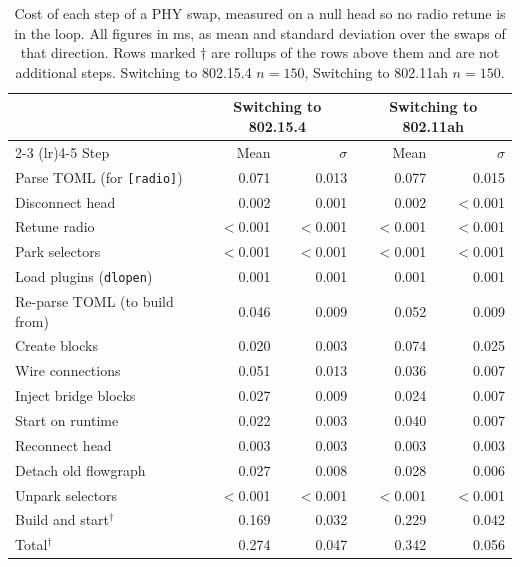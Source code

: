 \begin{table}[t]
  \centering
  \small
  \caption{Cost of each step of a PHY swap, measured on a null head so no radio retune is in the loop. All figures in ms, as mean and standard deviation over the swaps of that direction. Rows marked $\dagger$ are rollups of the rows above them and are not additional steps. Switching to 802.15.4 $n=150$, Switching to 802.11ah $n=150$.}
  \label{tab:softswap-latency}
  \begin{tabular}{lrrrr}
    \toprule
    & \multicolumn{2}{c}{Switching to 802.15.4} & \multicolumn{2}{c}{Switching to 802.11ah} \\
    \cmidrule(lr){2-3} \cmidrule(lr){4-5}
    Step & {Mean} & {$\sigma$} & {Mean} & {$\sigma$} \\
    \midrule
    Parse TOML (for \texttt{[radio]}) & 0.071 & 0.013 & 0.077 & 0.015 \\
    Disconnect head & 0.002 & 0.001 & 0.002 & $<$0.001 \\
    Retune radio & $<$0.001 & $<$0.001 & $<$0.001 & $<$0.001 \\
    Park selectors & $<$0.001 & $<$0.001 & $<$0.001 & $<$0.001 \\
    Load plugins (\texttt{dlopen}) & 0.001 & 0.001 & 0.001 & 0.001 \\
    Re-parse TOML (to build from) & 0.046 & 0.009 & 0.052 & 0.009 \\
    Create blocks & 0.020 & 0.003 & 0.074 & 0.025 \\
    Wire connections & 0.051 & 0.013 & 0.036 & 0.007 \\
    Inject bridge blocks & 0.027 & 0.009 & 0.024 & 0.007 \\
    Start on runtime & 0.022 & 0.003 & 0.040 & 0.007 \\
    Reconnect head & 0.003 & 0.003 & 0.003 & 0.003 \\
    Detach old flowgraph & 0.027 & 0.008 & 0.028 & 0.006 \\
    Unpark selectors & $<$0.001 & $<$0.001 & $<$0.001 & $<$0.001 \\
    \midrule
    Build and start$^\dagger$ & 0.169 & 0.032 & 0.229 & 0.042 \\
    \midrule
    Total$^\dagger$ & 0.274 & 0.047 & 0.342 & 0.056 \\
    \bottomrule
  \end{tabular}
\end{table}
